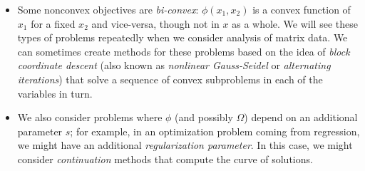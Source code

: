 \documentclass[12pt, leqno]{article} %
\begin{document}
\begin{itemize}
\item
  Some nonconvex objectives are {\em bi-convex}:
  $\phi(x_1, x_2)$ is a convex function of $x_1$ for a fixed
  $x_2$ and vice-versa, though not in $x$ as a whole.
  We will see these types of problems repeatedly
  when we consider analysis of matrix data.  We can sometimes create
  methods for these problems based on the idea of
  {\em block coordinate descent} (also known as {\em nonlinear Gauss-Seidel}
  or {\em alternating iterations}) that solve a sequence of convex
  subproblems in each of the variables in turn.

\item
  We also consider problems where
  $\phi$ (and possibly $\Omega$) depend on an additional parameter
  $s$; for example, in an optimization problem coming from regression,
  we might have an additional {\em regularization parameter}.  In this
  case, we might consider {\em continuation} methods that 
  compute the curve of solutions.
  
\end{itemize}
\end{document}
